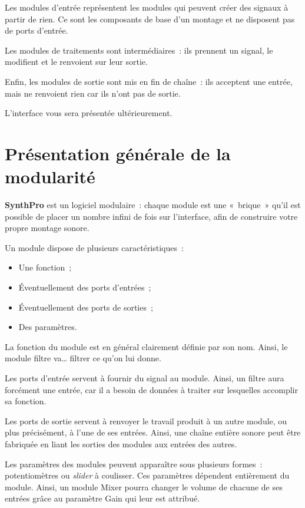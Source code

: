 \documentclass[a4paper,oneside,frenchb,10pt]{article}
\begin{document}
Les modules d'entrée représentent les modules qui peuvent créer des
signaux à partir de rien. Ce sont les composants de base d'un montage et
ne disposent pas de ports d'entrée.

Les modules de traitements sont intermédiaires~: ils prennent un signal,
le modifient et le renvoient sur leur sortie.

Enfin, les modules de sortie sont mis en fin de chaîne~: ils acceptent
une entrée, mais ne renvoient rien car ils n'ont pas de sortie.

L'interface vous sera présentée ultérieurement.

\section{Présentation générale de la modularité}

\textbf{SynthPro} est un logiciel modulaire~: chaque module est une «~brique~»
qu'il est possible de placer un nombre infini de fois sur l'interface,
afin de construire votre propre montage sonore.

Un module dispose de plusieurs caractéristiques~:

\begin{itemize}
\item
  Une fonction~;
\item
  Éventuellement des ports d'entrées~;
\item
  Éventuellement des ports de sorties~;
\item
  Des paramètres.
\end{itemize}
La fonction du module est en général clairement définie par son nom.
Ainsi, le module filtre va\ldots{} filtrer ce qu'on lui donne.

Les ports d'entrée servent à fournir du signal au module. Ainsi, un
filtre aura forcément une entrée, car il a besoin de données à traiter
sur lesquelles accomplir sa fonction.

Les ports de sortie servent à renvoyer le travail produit à un autre
module, ou plus précisément, à l'une de ses entrées. Ainsi, une chaîne
entière sonore peut être fabriquée en liant les sorties des modules aux
entrées des autres.

Les paramètres des modules peuvent apparaître sous plusieurs formes~:
potentiomètres ou \emph{slider} à coulisser. Ces paramètres dépendent
entièrement du module. Ainsi, un module Mixer pourra changer le volume
de chacune de ses entrées grâce au paramètre Gain qui leur est attribué.
\end{document}
